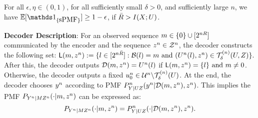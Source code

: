 \vspace{3pt}
\begin{proposition}\label{prop:clssubPMF}
    For all $\epsilon,\eta \in (0,1)$, for all sufficiently small $\delta > 0$, and sufficiently large $n$, we have $\EE[{\Ipmf}] \geq 1-\epsilon$,
if $\bar{R} > I(X;U)$.
\end{proposition}

\vspace{3pt}
\noindent \textbf{Decoder Description}: 
For an observed sequence $m \in \{0\} \cup [2^{nR}]$ communicated by the encoder and the sequence $z^n \in \mathcal{Z}^n$, the decoder constructs the following set:
$\mathsf{L}(m,z^n) := \{l \in [2^{n\bar{R}}] : \mathcal{B}(l) = m \text{ and } (U^n(l),z^n) \in \mathcal{T}_\delta^{(n)}(U,Z)\}.$
After this, the decoder outputs $\mathcal{D}(m,z^n) = U^n(l)$ if $\mathsf{L}(m,z^n) = \{l\} \text{ and } m\neq 0$. Otherwise, the decoder outputs a fixed $u^n_0 \in \mathcal{U}^n \backslash \mathcal{T}_\delta^{(n)}(U)$. At the end, the decoder chooses $y^n$ according to PMF $P^n_{Y|UZ}(y^n|\mathcal{D}(m,z^n),z^n)$. This implies the PMF $P_{Y^n|MZ^n}(\cdot|m,z^n)$ can be expressed as: 
\[P_{Y^n|MZ^n}(\cdot|m,z^n) = P^n_{Y|UZ}(\cdot|\mathcal{D}(m,z^n),z^n).\]

